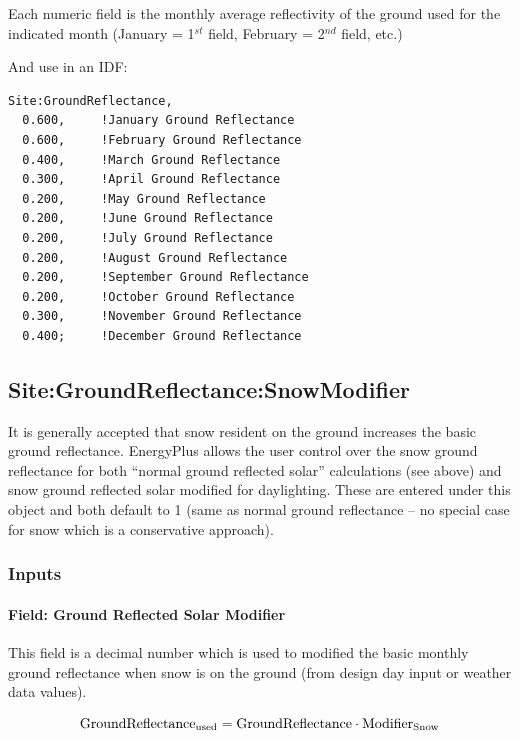 Each numeric field is the monthly average reflectivity of the ground used for the indicated month (January = 1\(^{st}\) field, February = 2\(^{nd}\) field, etc.)

And use in an IDF:

\begin{lstlisting}
Site:GroundReflectance,
  0.600,     !January Ground Reflectance
  0.600,     !February Ground Reflectance
  0.400,     !March Ground Reflectance
  0.300,     !April Ground Reflectance
  0.200,     !May Ground Reflectance
  0.200,     !June Ground Reflectance
  0.200,     !July Ground Reflectance
  0.200,     !August Ground Reflectance
  0.200,     !September Ground Reflectance
  0.200,     !October Ground Reflectance
  0.300,     !November Ground Reflectance
  0.400;     !December Ground Reflectance
\end{lstlisting}

\subsection{Site:GroundReflectance:SnowModifier}\label{sitegroundreflectancesnowmodifier}

It is generally accepted that snow resident on the ground increases the basic ground reflectance. EnergyPlus allows the user control over the snow ground reflectance for both ``normal ground reflected solar'' calculations (see above) and snow ground reflected solar modified for daylighting. These are entered under this object and both default to 1 (same as normal ground reflectance -- no special case for snow which is a conservative approach).

\subsubsection{Inputs}\label{inputs-20-003}

\paragraph{Field: Ground Reflected Solar Modifier}\label{field-ground-reflected-solar-modifier}

This field is a decimal number which is used to modified the basic monthly ground reflectance when snow is on the ground (from design day input or weather data values).

\begin{equation}
\rm{GroundReflectance}_{\rm{used}} = \rm{GroundReflectance} \cdot \rm{Modifier}_{\rm{Snow}}
\end{equation}

